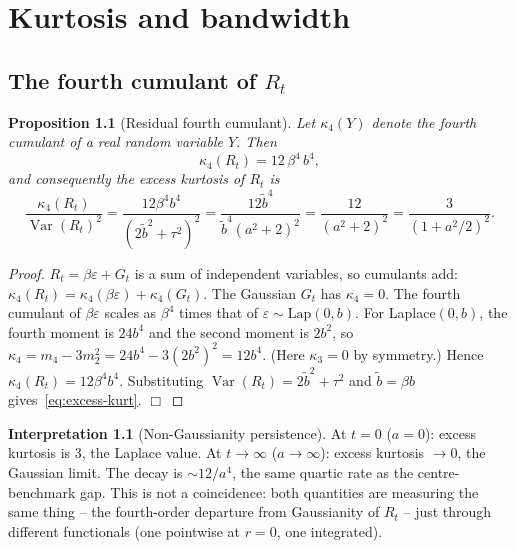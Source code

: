 \documentclass[11pt,a4paper,openany]{book}
\theoremstyle{plainserif}
\newtheorem{proposition}[theorem]{Proposition}
\theoremstyle{definition}
\theoremstyle{remarkstyle}
\newtheorem*{interpretation}{Interpretation}
\newcommand{\V}{\operatorname{Var}}
\newcommand{\Lap}{\mathrm{Lap}}
\newcommand{\btilde}{\tilde{b}}
\begin{document}
\chapter{Kurtosis and bandwidth}
\label{ch:kurtosis}

\section{The fourth cumulant of $R_t$}

\begin{proposition}[Residual fourth cumulant]
\label{prop:kurt}
Let $\kappa_4(Y)$ denote the fourth cumulant of a real random variable
$Y$. Then
\begin{equation}
\kappa_4(R_t) = 12\,\beta^4\,b^4,
\label{eq:kappa4}
\end{equation}
and consequently the excess kurtosis of $R_t$ is
\begin{equation}
\frac{\kappa_4(R_t)}{\V(R_t)^2} = \frac{12\beta^4 b^4}{(2\btilde^2 + \tau^2)^2}
 = \frac{12 \btilde^4}{\btilde^4(a^2+2)^2}
 = \frac{12}{(a^2+2)^2}
 = \frac{3}{(1 + a^2/2)^2}.
\label{eq:excess-kurt}
\end{equation}
\end{proposition}

\begin{proof}
$R_t = \beta\varepsilon + G_t$ is a sum of independent variables, so
cumulants add: $\kappa_4(R_t) = \kappa_4(\beta\varepsilon) + \kappa_4(G_t)$.
The Gaussian $G_t$ has $\kappa_4 = 0$.
The fourth cumulant of $\beta\varepsilon$ scales as $\beta^4$ times that of
$\varepsilon \sim \Lap(0,b)$. For Laplace$(0,b)$, the fourth moment is
$24 b^4$ and the second moment is $2b^2$, so
$\kappa_4 = m_4 - 3 m_2^2 = 24b^4 - 3(2b^2)^2 = 12b^4$. (Here
$\kappa_3 = 0$ by symmetry.) Hence
$\kappa_4(R_t) = 12\beta^4 b^4$. Substituting $\V(R_t) = 2\btilde^2 + \tau^2$
and $\btilde = \beta b$ gives~\eqref{eq:excess-kurt}. $\Box$
\end{proof}

\begin{interpretation}[Non-Gaussianity persistence]
At $t=0$ ($a=0$): excess kurtosis is $3$, the Laplace value.
At $t\to\infty$ ($a\to\infty$): excess kurtosis $\to 0$, the Gaussian
limit. The decay is $\sim 12/a^4$, the same quartic rate as the
centre-benchmark gap. This is not a coincidence: both quantities are
measuring the same thing -- the fourth-order departure from Gaussianity
of $R_t$ -- just through different functionals (one pointwise at $r=0$,
one integrated).
\end{interpretation}
\end{document}
